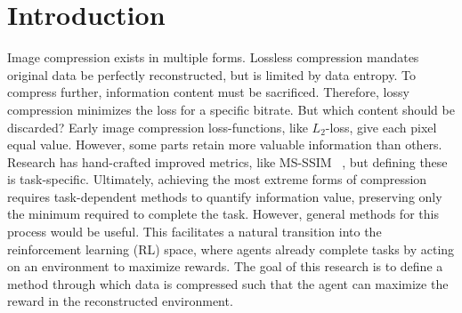 \section{Introduction}\label{sec:Introduction}
Image compression exists in multiple forms. Lossless compression mandates
original data be perfectly reconstructed, but is limited by data entropy. To
compress further, information content must be sacrificed. Therefore, lossy
compression minimizes the loss for a specific bitrate. But which content should
be discarded? Early image compression loss-functions, like $L_2$-loss, give each
pixel equal value. However, some parts retain more valuable information than
others. Research has hand-crafted improved metrics, like MS-SSIM
~\cite{1292216}, but defining these is task-specific. Ultimately, achieving the
most extreme forms of compression requires task-dependent methods to quantify
information value, preserving only the minimum required to complete the task.
However, general methods for this process would be useful. This facilitates a
natural transition into the reinforcement learning (RL) space, where agents
already complete tasks by acting on an environment to maximize rewards. The goal
of this research is to define a method through which data is compressed such
that the agent can maximize the reward in the reconstructed environment.
